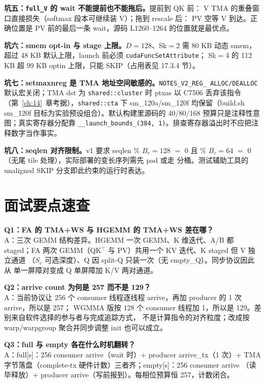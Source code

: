 \textbf{坑五：\texttt{full\_V} 的 wait 不能提前也不能拖后。}提前到 QK 前：
V TMA 的重叠窗口直接损失（softmax 段本可继续装 V）；拖到 rescale 后：
PV 空等 V 到达。正确位置是 PV 前的最后一条 wait，源码 L1260--1264
的位置就是最优点。

\textbf{坑六：smem opt-in 与 stage 上限。}$D{=}128$、Sk$=$2 需 80 KB 动态
smem，超过 48 KB 默认上限，launch 前必须 \texttt{cuda\allowbreak{}Func\allowbreak{}Set\allowbreak{}Attribute}；
Sk$=$4 的 112 KB 超 99 KB optin 上限，只能 SKIP（占用表见 17.3.4 节）。

\textbf{坑七：setmaxnreg 是 TMA 地址空间敏感的。}\texttt{NOTES\_\allowbreak{}V2\_\allowbreak{}REG\_\allowbreak{}
ALLOC/\allowbreak{}DEALLOC} 默认宏关闭；TMA dst 为 \texttt{shared::cluster} 时 ptxas 以 C7506
丢弃该指令（第~\ref{ch:14}~章考据），\texttt{shared::cta} 下 sm\_120a/sm\_120f
均保留（build.sh sm\_120f 目标为实验预设组合）。默认构建里源码的
40/80/168 预算只是注释性意图；真实寄存器分配靠
\texttt{\_\allowbreak{}\_\allowbreak{}launch\_\allowbreak{}bounds\_\allowbreak{}(384,\allowbreak{} 1)}。排查寄存器溢出时不应把注释数字当作事实。

\textbf{坑八：seqlen 对齐限制。}\allowbreak{}v1 要求 seqlen $\%$ $B_r{=}128$ $=$ 0 且
$\%$ $B_c{=}64$ $=$ 0（无尾 tile 处理），实际部署的变长序列需先 pad 或走
分桶。测试辅助工具的 unaligned SKIP 分支即此约束的运行时表达。

\section{面试要点速查}

\textbf{Q1：FA 的 TMA+WS 与 HGEMM 的 TMA+WS 差在哪？}\\
A：三次 GEMM 结构差异。HGEMM 一次 GEMM、K 维迭代、A/B 都 staged；FA
两次 GEMM（QK$^\top$ 与 PV）共用一个 KV 迭代、K staged 但 V 独立通道
（$S_v$ 可选深度）、Q 因 split-Q 只装一次（无 empty\_Q）。同步协议因此从
单一屏障对变成 Q 单屏障加 K/V 两对通道。

\textbf{Q2：arrive count 为何是 257 而不是 129？}\\
A：当前协议让 256 个 consumer 线程逐线程 arrive，再加 producer 的 1 次 arrive，所以是 257；
WGMMA 版按 128 个 consumer 线程加 1，所以是 129。差别来自软件选择的参与者与完成追踪方式，
不是计算指令的对齐粒度；改成按 warp/warpgroup 聚合并同步调整 init 也可以成立。

\textbf{Q3：full 与 empty 各在什么时机翻转？}\\
A：full[s]：256 consumer arrive（wait 时）$+$ producer arrive\_tx（1 次）$+$
TMA 字节落盘（complete-tx 硬件计数）三者齐；empty[s]：256 consumer arrive
（读毕释放）$+$ producer arrive（写前报到）。每相位预算恒 257，计数闭合。

